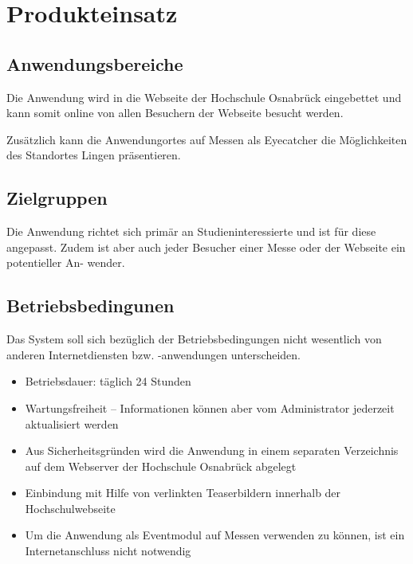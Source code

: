 \section{Produkteinsatz}
\label{sec:Produkteinsatz}

\subsection{Anwendungsbereiche}
\label{sec:Anwendungsbereiche}
Die Anwendung wird in die Webseite der Hochschule Osnabrück eingebettet und kann
somit online von allen Besuchern der Webseite besucht werden.

Zusätzlich kann die Anwendungortes auf Messen als Eyecatcher die Möglichkeiten des Standortes Lingen präsentieren.

\subsection{Zielgruppen}
\label{sec:Zielgruppen}

Die Anwendung richtet sich primär an Studieninteressierte und ist für diese angepasst.
Zudem ist aber auch jeder Besucher einer Messe oder der Webseite ein potentieller An-
wender.

\subsection{Betriebsbedingunen}
\label{sec:Betriebsbedingunen}

Das System soll sich bezüglich der Betriebsbedingungen nicht wesentlich von anderen
Internetdiensten bzw. -anwendungen unterscheiden.

\begin{itemize}
  \item Betriebsdauer: täglich 24 Stunden
  \item Wartungsfreiheit – Informationen können aber vom Administrator jederzeit aktualisiert werden
  \item Aus Sicherheitsgründen wird die Anwendung in einem separaten Verzeichnis auf dem Webserver der Hochschule Osnabrück abgelegt
  \item Einbindung mit Hilfe von verlinkten Teaserbildern innerhalb der Hochschulwebseite
  \item Um die Anwendung als Eventmodul auf Messen verwenden zu können, ist ein Internetanschluss nicht notwendig
\end{itemize}